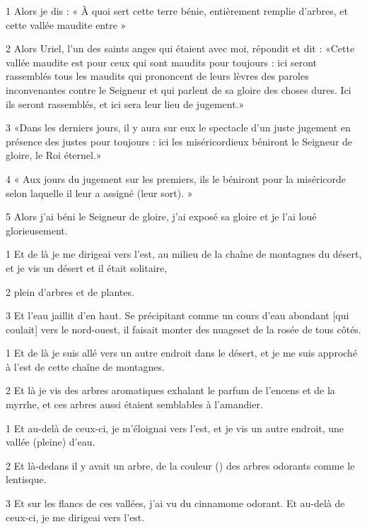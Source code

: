
\par 1 Alors je dis : « À quoi sert cette terre bénie, entièrement remplie d’arbres, et cette vallée maudite entre »
\par 2 Alors Uriel, l'un des saints anges qui étaient avec moi, répondit et dit : «Cette vallée maudite est pour ceux qui sont maudits pour toujours : ici seront rassemblés tous les maudits qui prononcent de leurs lèvres des paroles inconvenantes contre le Seigneur et qui parlent de sa gloire des choses dures. Ici ils seront rassemblés, et ici sera leur lieu de jugement.»
\par 3 «Dans les derniers jours, il y aura sur eux le spectacle d'un juste jugement en présence des justes pour toujours : ici les miséricordieux béniront le Seigneur de gloire, le Roi éternel.»
\par 4 « Aux jours du jugement sur les premiers, ils le béniront pour la miséricorde selon laquelle il leur a assigné (leur sort). »
\par 5 Alors j'ai béni le Seigneur de gloire, j'ai exposé sa gloire et je l'ai loué glorieusement.


\par 1 Et de là je me dirigeai vers l'est, au milieu de la chaîne de montagnes du désert, et je vis un désert et il était solitaire,
\par 2 plein d'arbres et de plantes.
\par 3 Et l'eau jaillit d'en haut. Se précipitant comme un cours d'eau abondant [qui coulait] vers le nord-ouest, il faisait monter des nuages ​​et de la rosée de tous côtés.


\par 1 Et de là je suis allé vers un autre endroit dans le désert, et je me suis approché à l'est de cette chaîne de montagnes.
\par 2 Et là je vis des arbres aromatiques exhalant le parfum de l'encens et de la myrrhe, et ces arbres aussi étaient semblables à l'amandier.


\par 1 Et au-delà de ceux-ci, je m'éloignai vers l'est, et je vis un autre endroit, une vallée (pleine) d'eau.
\par 2 Et là-dedans il y avait un arbre, de la couleur () des arbres odorants comme le lentisque.
\par 3 Et sur les flancs de ces vallées, j'ai vu du cinnamome odorant. Et au-delà de ceux-ci, je me dirigeai vers l'est.

